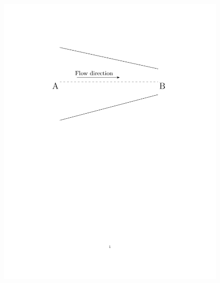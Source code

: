 \documentclass[journal,12pt,onecolumn,article]{IEEEtran}
\theoremstyle{remark}
\begin{document}
\begin{enumerate}
		\vspace{-75pt}
			\begin{figure}[H]
	\centering
				\begin{minipage}{0.75\textwidth}
	\includegraphics[width=0.7\linewidth]{figs/fig30/fig30.pdf}
			\end{minipage}
			\end{figure}
		\vspace{-180pt}


\end{enumerate}
\end{document}
